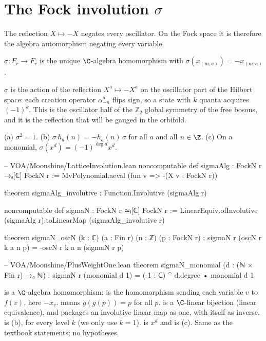 \section{The Fock involution \texorpdfstring{$\sigma$}{sigma}}\label{ch04:sec:sigma}

The reflection $X\mapsto-X$ negates every oscillator. On the Fock space it is therefore the
algebra automorphism negating every variable.

\begin{definition}\label{ch04:def:sigma}
$\sigma:F_r\to F_r$ is the unique $\C$-algebra homomorphism with $\sigma(x_{(m,a)})=-x_{(m,a)}$.
\end{definition}

\begin{physics}
$\sigma$ is the action of the reflection $X^a\mapsto-X^a$ on the oscillator part of the Hilbert space: each creation operator $\alpha^a_{-n}$ flips sign, so a state with $k$ quanta acquires $(-1)^k$. This is the oscillator half of the $\mathbb Z_2$ global symmetry of the free bosons, and it is the reflection that will be gauged in the orbifold.
\end{physics}

\begin{proposition}\label{ch04:prop:sigma}
(a) $\sigma^2=1$. (b) $\sigma\,h_a(n)=-h_a(n)\,\sigma$ for all $a$ and all $n\in\Z$.
(c) On a monomial, $\sigma(x^d)=(-1)^{\deg d}x^d$.
\end{proposition}

\begin{leancode}
-- VOA/Moonshine/LatticeInvolution.lean
noncomputable def sigmaAlg : FockN r →ₐ[ℂ] FockN r := MvPolynomial.aeval (fun v => -(X v : FockN r))

theorem sigmaAlg_involutive : Function.Involutive (sigmaAlg r)

noncomputable def sigmaN : FockN r ≃ₗ[ℂ] FockN r :=
  LinearEquiv.ofInvolutive (sigmaAlg r).toLinearMap (sigmaAlg_involutive r)

theorem sigmaN_oscN (k : ℂ) (a : Fin r) (n : ℤ) (p : FockN r) :
    sigmaN r (oscN r k a n p) = -oscN r k a n (sigmaN r p)

-- VOA/Moonshine/PlusWeightOne.lean
theorem sigmaN_monomial (d : (ℕ × Fin r) →₀ ℕ) :
    sigmaN r (monomial d 1) = (-1 : ℂ) ^ d.degree • monomial d 1
\end{leancode}

\begin{dictionary}
 is a $\C$-algebra homomorphism;  is the homomorphism
sending each variable $v$ to $f(v)$, here $-x_v$.  means $g(g(p))=p$ for
all $p$.  is a $\C$-linear bijection (linear equivalence), and
 packages an involutive linear map as one, with itself as inverse.
 is (b), for every level $k$ (we only use $k=1$).  is $x^d$
and  is (c). Same as the textbook statements; no hypotheses.
\end{dictionary}

